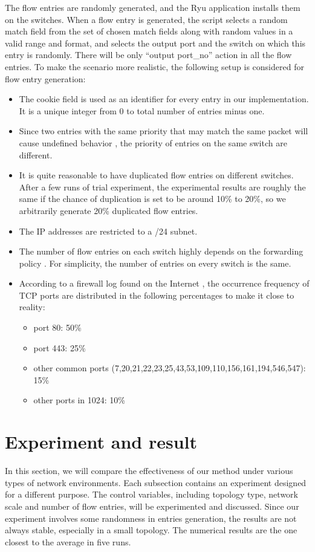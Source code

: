 The flow entries are randomly generated, and the Ryu application installs them on the switches. When a flow entry is generated, the script selects a random match field from the set of chosen match fields along with random values in a valid range and format, and selects the output port and the switch on which this entry is randomly. There will be only ``output port\_no'' action in all the flow entries. To make the scenario more realistic, the following setup is considered for flow entry generation:

\begin{itemize}
\item 
The cookie field is used as an identifier for every entry in our implementation. It is a unique integer from 0 to total number of entries minus one.
\item
Since two entries with the same priority that may match the same packet will cause undefined behavior \cite{OF_SPEC}, the priority of entries on the same switch are different.
\item
It is quite reasonable to have duplicated flow entries on different switches. After a few runs of trial experiment, the experimental results are roughly the same if the chance of duplication is set to be around 10\% to 20\%, so we arbitrarily generate 20\% duplicated flow entries. 
\item
The IP addresses are restricted to a /24 subnet.
\item
The number of flow entries on each switch highly depends on the forwarding policy \cite{MPFHMRSV09}. For simplicity, the number of entries on every switch is the same. 
\item
According to a firewall log found on the Internet \cite{PORT_FREQ}, the occurrence frequency of TCP ports are distributed in the following percentages to make it close to reality:
\begin{itemize}
\item
port 80: 50\%
\item
port 443: 25\%
\item
other common ports (7,20,21,22,23,25,43,53,109,110,156,161,194,546,547): 15\%
\item
other ports in 1024: 10\%
\end{itemize}
\end{itemize}

\section{Experiment and result}
In this section, we will compare the effectiveness of our method under various types of network environments. Each subsection contains an experiment designed for a different purpose. The control variables, including topology type, network scale and number of flow entries, will be experimented and discussed. Since our experiment involves some randomness in entries generation, the results are not always stable, especially in a small topology. The numerical results are the one closest to the average in five runs.

